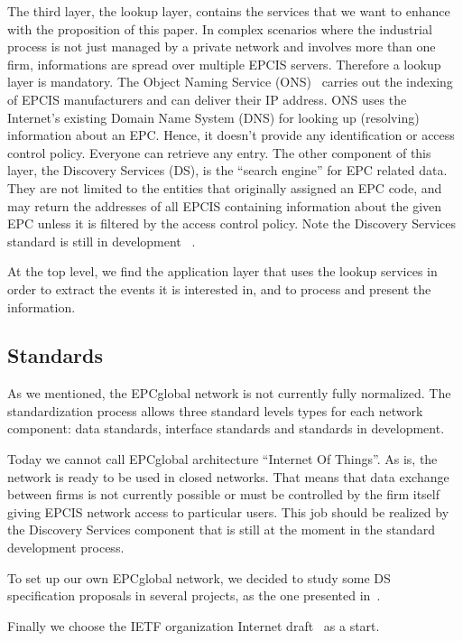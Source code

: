 \documentclass[a4paper]{llncs}
\begin{document}
The third layer, the lookup layer, contains the services that we want to enhance
with the proposition of this paper.  In complex scenarios where the industrial
process is not just managed by a private network and involves more than one firm,
informations are spread over multiple EPCIS servers. Therefore a lookup layer is
mandatory. The Object Naming Service (ONS)~\cite{ons} carries out the indexing
of EPCIS manufacturers and can deliver their IP address. ONS uses the Internet's
existing Domain Name System (DNS)%
for looking up (resolving) information about an EPC. Hence, it doesn't provide
any identification or access control policy. Everyone can retrieve any entry.
The other component of this layer, the Discovery Services (DS), is the ``search
engine'' for EPC related data. They are not limited to the entities that originally
assigned an EPC code, and may return the addresses of all EPCIS containing
information about the given EPC unless it is filtered by the access control
policy. Note the Discovery Services standard is still in development~\cite{dsconcept} . 

At the top level, we find the application layer that uses the lookup services 
in order to extract the events it is interested in, and to process and present
the information.

\subsection{Standards}
As we mentioned, the EPCglobal network is not currently fully normalized. 
The standardization process allows three standard levels types for each network component: 
data standards, interface standards and standards in development.

Today we cannot call EPCglobal architecture ``Internet Of Things''. As is, the network is ready to
be used in closed networks. That means that data exchange between firms is not currently possible or
must be controlled by the firm itself giving EPCIS network access to particular users. This job
should be realized by the Discovery Services component that is still at the moment in the standard
development process.

To set up our own EPCglobal network, we decided to study some DS specification proposals in several
projects, as the one presented in~\cite{BRIDGE}.

Finally we choose the IETF organization Internet draft~\cite{dsconcept} as a start.
\end{document}
